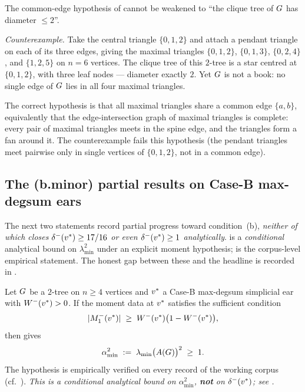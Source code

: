\begin{remark}\label{rem:diam2-not-books}
The common-edge hypothesis of  cannot be
weakened to ``the clique tree of $G$ has diameter $\le 2$''.

\emph{Counterexample.} Take the central triangle $\{0, 1, 2\}$ and
attach a pendant triangle on each of its three edges, giving the
maximal triangles $\{0, 1, 2\}$, $\{0, 1, 3\}$, $\{0, 2, 4\}$, and
$\{1, 2, 5\}$ on $n = 6$ vertices. The clique tree of this $2$-tree
is a star centred at $\{0, 1, 2\}$, with three leaf nodes — diameter
exactly $2$. Yet $G$ is not a book: no single edge of $G$
lies in all four maximal triangles.

The correct hypothesis is that all maximal triangles share a common
edge $\{a, b\}$, equivalently that the edge-intersection graph of
maximal triangles is complete: every pair of maximal triangles meets in
the spine edge, and the triangles form a fan around it. The
counterexample fails this hypothesis (the pendant triangles meet
pairwise only in single vertices of $\{0, 1, 2\}$, not in a common
edge).
\end{remark}

\subsection{The (b.minor) partial results on Case-B max-degsum ears}\label{sec:moment-form:bminor}

The next two statements record partial progress toward condition~(b),
\emph{neither of which closes $\delta^{-}(v^{*}) \ge 17/16$ or even
$\delta^{-}(v^{*}) \ge 1$ analytically}.  is a
\emph{conditional} analytical bound on $\lambda_{\min}^{2}$ under an
explicit moment hypothesis;  is the corpus-level
empirical statement. The honest gap between these and the headline is
recorded in .

\begin{lemma}\label{lem:bminor-amin}
Let $G$ be a $2$-tree on $n \ge 4$ vertices and $v^{*}$ a
Case-B max-degsum simplicial ear with $W^{-}(v^{*}) > 0$. If the moment
data at $v^{*}$ satisfies the sufficient condition
\[
|M_{1}^{-}(v^{*})| \;\ge\; W^{-}(v^{*})\bigl(1 - W^{-}(v^{*})\bigr),
\]
then  gives
\[
\alpha_{\min}^{2} \;:=\; \lambda_{\min}\bigl(A(G)\bigr)^{2}
\;\ge\; 1.
\]
The hypothesis is empirically verified on every record of the working
corpus (cf.\ ). \emph{This is a conditional
analytical bound on $\alpha_{\min}^{2}$, \textbf{not} on
$\delta^{-}(v^{*})$; see .}
\end{lemma}

